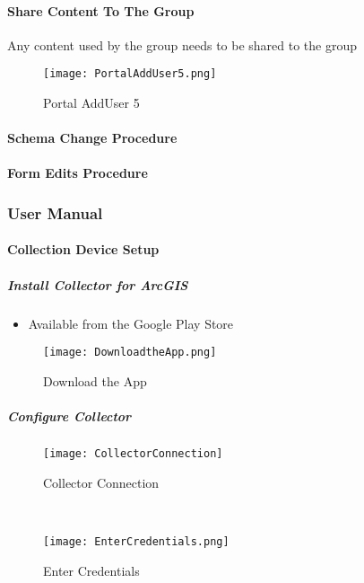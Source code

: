 \paragraph[Share Portal Content]{\Large Share Content To The Group\texorpdfstring{\\}{}}
\vspace{.5in}

\noindent Any content used by the group needs to be shared to the group
\vspace{.5in}

\begin{figure}[h!]
\centering
    \texttt{[image: PortalAddUser5.png]}
\caption{Portal AddUser 5}
\end{figure}
\clearpage
\paragraph[Schema Change Procedure]{\Large Schema Change Procedure}
\clearpage
\paragraph[Form Edits Procedure]{\Large Form Edits Procedure}
\clearpage
\subsubsection[User Manual]{\Large User Manual}
\paragraph{Collection Device Setup}
\subparagraph{Install Collector for ArcGIS}
\begin{itemize}
\item Available from the Google Play Store
\end{itemize}
\begin{figure}[h!]
\centering
    \texttt{[image: DownloadtheApp.png]}
\caption{Download the App}
\end{figure}
\clearpage
\subparagraph[Configure Collector]{\Large Configure Collector}
\begin{wrapfigure}{r}{0.5\textwidth}
\centering
\texttt{[image: CollectorConnection]}
\caption{Collector Connection}

\HRule \\[.4cm] %
\vspace{.1in}

    \texttt{[image: EnterCredentials.png]}
\vspace{-.1in}

\caption{Enter Credentials}
\end{wrapfigure}

